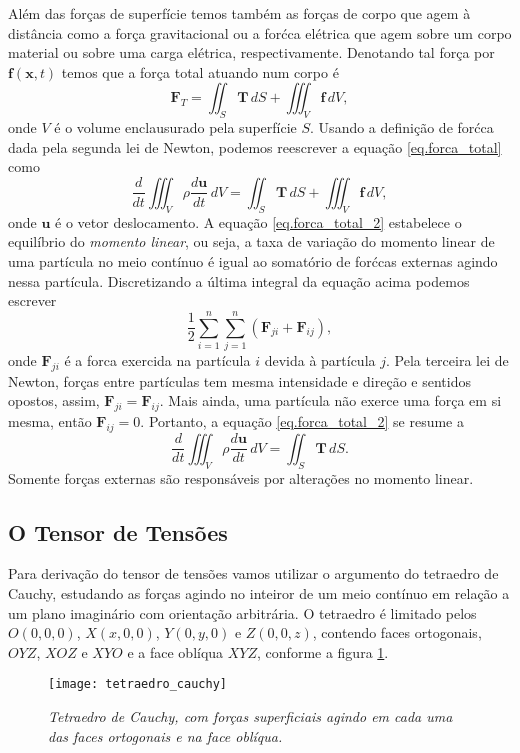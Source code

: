 Al\'em das for\c{c}as de superf\'icie temos tamb\'em as for\c{c}as de corpo que agem \`a dist\^ancia como a for\c{c}a gravitacional ou a for\'c{c}a el\'etrica que agem sobre um corpo material ou sobre uma carga el\'etrica, respectivamente. Denotando tal for\c{c}a por $\mathbf{f}(\mathbf{x},t)$ temos que a for\c{c}a total atuando num corpo \'e
\begin{equation}\label{eq.forca_total}
\mathbf{F}_T=\iint_S\mathbf{T}\,dS+\iiint_V\mathbf{f}\,dV,
\end{equation}
onde $V$ \'e o volume enclausurado pela superf\'icie $S$. Usando a defini\c{c}\~ao de for\'c{c}a dada pela segunda lei de Newton, podemos reescrever a equa\c{c}\~ao \ref{eq.forca_total} como
\begin{equation}\label{eq.forca_total_2}
\frac{d}{dt}\iiint_V\rho\frac{d\mathbf{u}}{dt}\,dV=\iint_S\mathbf{T}\,dS+\iiint_V\mathbf{f}\,dV,
\end{equation}
onde $\mathbf{u}$ \'e o vetor deslocamento. A equa\c{c}\~ao \ref{eq.forca_total_2} estabelece o equil\'ibrio do \textit{momento linear}, ou seja, a taxa de varia\c{c}\~ao do momento linear de uma part\'icula no meio cont\'inuo \'e igual ao somat\'orio de for\'c{c}as externas agindo nessa part\'icula. Discretizando a \'ultima integral da equa\c{c}\~ao acima podemos escrever
\begin{equation*}
\frac{1}{2}\sum_{i=1}^n\sum_{j=1}^n(\mathbf{F}_{ji}+\mathbf{F}_{ij}),
\end{equation*}
onde $\mathbf{F}_{ji}$ \'e a forca exercida na part\'icula $i$ devida \`a part\'icula $j$. Pela terceira lei de Newton, for\c{c}as entre part\'iculas tem mesma intensidade e dire\c{c}\~ao e sentidos opostos, assim, $\mathbf{F}_{ji}=\mathbf{F}_{ij}$. Mais ainda, uma part\'icula n\~ao exerce uma for\c{c}a em si mesma, ent\~ao $\mathbf{F}_{ij}=0$. Portanto, a equa\c{c}\~ao \ref{eq.forca_total_2} se resume a
\begin{equation*}
\frac{d}{dt}\iiint_V\rho\frac{d\mathbf{u}}{dt}\,dV=\iint_S\mathbf{T}\,dS.
\end{equation*}
Somente for\c{c}as externas s\~ao respons\'aveis por altera\c{c}\~oes no momento linear.

\subsection{O Tensor de Tens\~oes}\label{sec.tensor_tensoes}

Para deriva\c{c}\~ao do tensor de tens\~oes vamos utilizar o argumento do tetraedro de Cauchy, estudando as for\c{c}as agindo no inteiror de um meio cont\'inuo em rela\c{c}\~ao a um plano imagin\'ario com orienta\c{c}\~ao arbitr\'aria. O tetraedro \'e limitado pelos $O(0,0,0)$, $X(x,0,0)$, $Y(0,y,0)$ e $Z(0,0,z)$, contendo faces ortogonais, $OYZ$, $XOZ$ e $XYO$ e a face obl\'iqua $XYZ$, conforme a figura \ref{fig.tetraedro}.
\begin{figure}
\centering
\texttt{[image: tetraedro\_cauchy]}
\caption{\textit{Tetraedro de Cauchy, com for\c{c}as superficiais agindo em cada uma das faces ortogonais e na face obl\'iqua.}}
\label{fig.tetraedro}
\end{figure}

